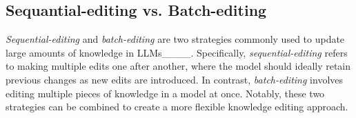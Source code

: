 








\subsection{Sequantial-editing vs. Batch-editing} \label{sec:comparison}

\textit{Sequential-editing} and \textit{batch-editing} are two strategies commonly used to update large amounts of knowledge in LLMs____. Specifically, \textit{sequential-editing} refers to making multiple edits one after another, where the model should ideally retain previous changes as new edits are introduced. In contrast, \textit{batch-editing} involves editing multiple pieces of knowledge in a model at once. Notably, these two strategies can be combined to create a more flexible knowledge editing approach.


